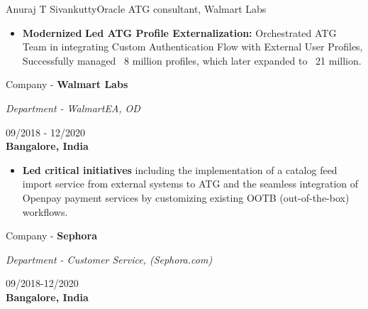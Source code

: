 \documentclass{article}
\begin{document}
\begin{cv}{Anuraj T Sivankutty}{Oracle ATG consultant, Walmart Labs}
\begin{cvevent}[Nov-2018][Dec-2020]
\begin{itemize}
        \item  \textbf{Modernized} \textbf{Led ATG Profile Externalization: } Orchestrated ATG Team in integrating Custom Authentication Flow with External User Profiles, Successfully managed ~8 million profiles, which later expanded to ~21 million.
        
    \end{itemize}
\end{cvevent}


\begin{cvevent}[Sept-2018][Dec-2020]

    \begin{center}
      \begin{minipage}{0.6\textwidth}
        Company - \textbf{Walmart Labs}
        \vspace{0.1cm}   
        
        \textit{Department - WalmartEA, OD}
      \end{minipage}
      \hfill
      \begin{minipage}{0.35\textwidth}
          \small{09/2018 - 12/2020}\\
        \textbf{Bangalore, India}
      \end{minipage}
    \end{center}
    
    \begin{itemize}
        \item  \textbf{Led critical initiatives} including the implementation of a catalog feed import service from external systems to ATG and the seamless integration of Openpay payment services by customizing existing OOTB (out-of-the-box) workflows.

    \end{itemize}
\end{cvevent}

\begin{cvevent}[Aug-2017][Sep-2018]
        \begin{center}
      \begin{minipage}{0.6\textwidth}
        Company - \textbf{Sephora}
        \vspace{0.1cm}
        
        \textit{Department - Customer Service, (Sephora.com)}
      \end{minipage}
      \hfill
      \begin{minipage}{0.35\textwidth}
          \small{09/2018-12/2020}\\
        \textbf{Bangalore, India}
      \end{minipage}
    \end{center}
    

\end{cvevent}
\end{cv}
\end{document}
